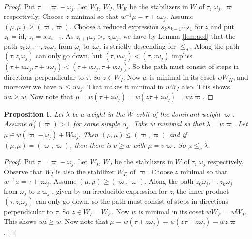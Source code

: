 \documentclass[sn-mathphys-num]{sn-jnl}%
\newcommand{\id}{{\mathrm{id}}}
\newtheorem{proposition}[theorem]{Proposition}
\theoremstyle{definition}
\begin{document}
  \begin{proof}
  Put $\tau=\varpi-\omega_j$. Let $W_I$, $W_J$, $W_K$ be the stabilizers in $W$ of $\tau$, $\omega_j$, $\varpi$ respectively.
  Choose $z$ minimal so that $w^{-1}\mu=\tau+z\omega_j$. Assume $(\mu,\mu)\geq(\varpi,\varpi)$.
  Choose a reduced expression $s_ks_{k-1}\cdots s_1$ for $z$ and put $z_0=\id$, $z_i=s_iz_{i-1}$. 
  As $z_{i+1}\omega_j>_ez_i\omega_j$, we have by Lemma \ref{lem:aed} that
the path $z_0\omega_j,\cdots, z_k\omega_j$ from $\omega_j$ to $z\omega_j$ is strictly descending for $\leq_d$.
  Along the path $(\tau,z_i\omega_j)$ 
  can only go down, but $(\tau,u\omega_j)<(\tau,v\omega_j)$ implies 
  $(\tau+u\omega_j,\tau+u\omega_j)<(\tau+v\omega_j,\tau+v\omega_j)$.
  So the path must consist of steps in directions perpendicular
  to $\tau$. So $z\in W_I$.
  Now $w$ is minimal in its coset $wW_K$, and moreover we have $w\leq w s_j$. That makes it minimal in $wW_I$ also.
  This shows $wz\geq w$. Now note that $\mu=w(\tau+z\omega_j)=w(z\tau+z\omega_j)=wz\varpi$.
  \end{proof}
  
  \begin{proposition}\label{prop:fartouch}
  Let $\lambda$ be a weight in the $W$ orbit of the dominant weight $\varpi$. 
  Assume $\alpha_j^\vee(\varpi)>1$ for some
  simple $\alpha_j$. Take $w$ minimal so that $\lambda=w\varpi$.  Let $\mu\in w(\varpi-\omega_j)+W\omega_j$. 
  Then $(\mu,\mu)\leq (\varpi,\varpi)$ and if $(\mu,\mu)=(\varpi,\varpi)$,
  then there is $v\geq w$ with $\mu=v\varpi$.  So $\mu\leq_a\lambda$.
  \end{proposition}
  \begin{proof}
  Put $\tau=\varpi-\omega_j$. Let $W_I$, $W_J$  be the stabilizers in $W$ of $\tau$, $\omega_j$ respectively.
  Observe that $W_I$ is also the stabilizer $W_K$ of $\varpi$.
  Choose $z$ minimal so that $w^{-1}\mu=\tau+z\omega_j$.
Assume $(\mu,\mu)\geq(\varpi,\varpi)$. 
  Along the path $z_0\omega_j,\cdots, z_k\omega_j$ from $\omega_j$ to $z\varpi_j$, given by an irreducible expression for $z$, the inner product $(\tau,z_i\omega_j)$ 
  can only go down, so the path must consist of steps in directions perpendicular
  to $\tau$. So $z\in W_I=W_K$.
  Now $w$ is minimal in its coset $wW_K=wW_I$.  This shows $wz\geq w$. Now note that $\mu=w(\tau+z\omega_j)=w(z\tau+z\omega_j)=wz\varpi$.
  \end{proof}       
\end{document}

